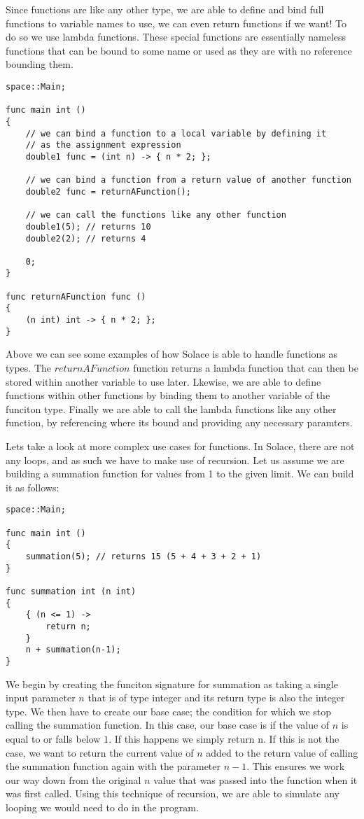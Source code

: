 \documentclass{article}
\begin{document}
Since functions are like any other type, we are able to define and bind full functions to variable names to use, we can even return functions if we want!
To do so we use lambda functions. These special functions are essentially nameless functions that can be bound to some name or used as they are
with no reference bounding them.

\begin{lstlisting}
space::Main;

func main int ()
{
	// we can bind a function to a local variable by defining it 
	// as the assignment expression
	double1 func = (int n) -> { n * 2; };

	// we can bind a function from a return value of another function
	double2 func = returnAFunction();

	// we can call the functions like any other function
	double1(5); // returns 10
	double2(2); // returns 4

	0;
}

func returnAFunction func ()
{
	(n int) int -> { n * 2; };
}
\end{lstlisting}

Above we can see some examples of how Solace is able to handle functions as types. The $returnAFunction$ function returns a lambda function
that can then be stored within another variable to use later. Lkewise, we are able to define functions within other functions by binding them
to another variable of the funciton type. Finally we are able to call the lambda functions like any other function, by referencing where its
bound and providing any necessary paramters.

Lets take a look at more complex use cases for functions. In Solace, there are not any loops, and as such we have to make use of recursion.
Let us assume we are building a summation function for values from 1 to the given limit. We can build it as follows:

\begin{lstlisting}
space::Main;

func main int ()
{
	summation(5); // returns 15 (5 + 4 + 3 + 2 + 1)
}

func summation int (n int)
{
	{ (n <= 1) ->
		return n;
	}
	n + summation(n-1);
} 
\end{lstlisting}

We begin by creating the funciton signature for summation as taking a single input parameter $n$ that is of type integer and its return type is also the integer type.
We then have to create our base case; the condition for which we stop calling the summation function. In this case, our base case is if the value of $n$ is equal to
or falls below $1$. If this happens we simply return n. If this is not the case, we want to return the current value of $n$ added to the return value of calling the
summation function again with the parameter $n-1$. This ensures we work our way down from the original $n$ value that was passed into the function when it was first
called. Using this technique of recursion, we are able to simulate any looping we would need to do in the program.
\end{document}
